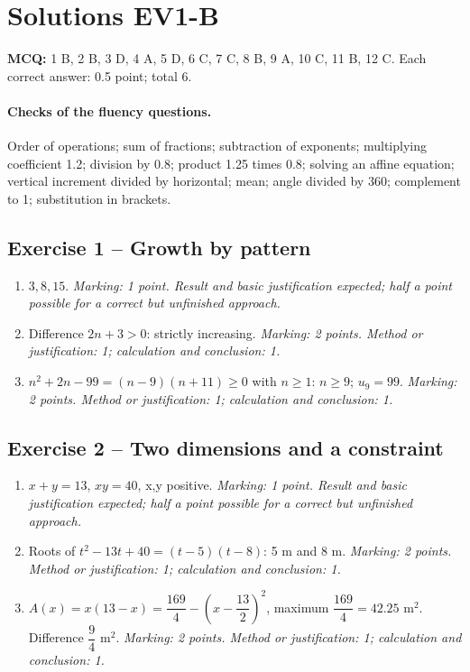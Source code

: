 \mxnewpage\section*{Solutions EV1-B}\label{EV1-B-CORR}
\textbf{MCQ:} 1 B, 2 B, 3 D, 4 A, 5 D, 6 C, 7 C, 8 B, 9 A, 10 C, 11 B, 12 C. Each correct answer: \num{0,5} point; total 6.
\paragraph{Checks of the fluency questions.} Order of operations; sum of fractions; subtraction of exponents; multiplying coefficient \num{1,2}; division by \num{0,8}; product \num{1,25} times \num{0,8}; solving an affine equation; vertical increment divided by horizontal; mean; angle divided by 360; complement to 1; substitution in brackets.
\subsection*{Exercise 1 -- Growth by pattern}
\begin{enumerate}
\item $3,8,15$. \textit{Marking: 1 point. Result and basic justification expected; half a point possible for a correct but unfinished approach.}
\item Difference $2n+3>0$: strictly increasing. \textit{Marking: 2 points. Method or justification: 1; calculation and conclusion: 1.}
\item $n^2+2n-99=(n-9)(n+11)\geq0$ with $n\geq1$: $n\geq9$; $u_9=99$. \textit{Marking: 2 points. Method or justification: 1; calculation and conclusion: 1.}
\end{enumerate}
\subsection*{Exercise 2 -- Two dimensions and a constraint}
\begin{enumerate}
\item $x+y=13$, $xy=40$, x,y positive. \textit{Marking: 1 point. Result and basic justification expected; half a point possible for a correct but unfinished approach.}
\item Roots of $t^2-13t+40=(t-5)(t-8)$: 5 m and 8 m. \textit{Marking: 2 points. Method or justification: 1; calculation and conclusion: 1.}
\item $A(x)=x(13-x)=\dfrac{169}{4}-(x-\dfrac{13}{2})^2$, maximum $\dfrac{169}{4}=\num{42,25}$ m$^2$. Difference $\dfrac{9}{4}$ m$^2$. \textit{Marking: 2 points. Method or justification: 1; calculation and conclusion: 1.}
\end{enumerate}
